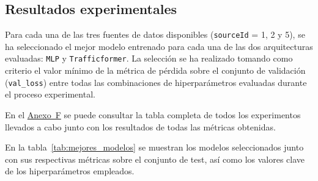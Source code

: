 \subsection{Resultados experimentales}
\label{sec:resultados_exp}

Para cada una de las tres fuentes de datos disponibles (\texttt{sourceId} = 1, 2 y 5), se ha seleccionado el mejor modelo entrenado para cada una de las dos arquitecturas evaluadas: \texttt{MLP} y \texttt{Trafficformer}. La selección se ha realizado tomando como criterio el valor mínimo de la métrica de pérdida sobre el conjunto de validación (\texttt{val\_loss}) entre todas las combinaciones de hiperparámetros evaluadas durante el proceso experimental.

En el \hyperref[anexo:resultados_exp]{Anexo~F} se puede consultar la tabla completa de todos los experimentos llevados a cabo junto con los resultados de todas las métricas obtenidas.

En la tabla~\ref{tab:mejores_modelos} se muestran los modelos seleccionados junto con sus respectivas métricas sobre el conjunto de test, así como los valores clave de los hiperparámetros empleados.

